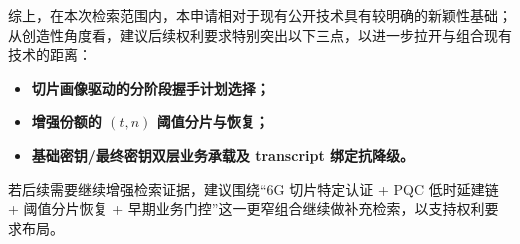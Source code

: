 \documentclass[12pt,a4paper]{article}
\begin{document}
综上，在本次检索范围内，本申请相对于现有公开技术具有较明确的新颖性基础；从创造性角度看，建议后续权利要求特别突出以下三点，以进一步拉开与组合现有技术的距离：

\begin{itemize}[leftmargin=2em]
    \item \textbf{切片画像驱动的分阶段握手计划选择；}
    \item \textbf{增强份额的 $(t,n)$ 阈值分片与恢复；}
    \item \textbf{基础密钥/最终密钥双层业务承载及 transcript 绑定抗降级。}
\end{itemize}

若后续需要继续增强检索证据，建议围绕“6G 切片特定认证 + PQC 低时延建链 + 阈值分片恢复 + 早期业务门控”这一更窄组合继续做补充检索，以支持权利要求布局。
\end{document}
